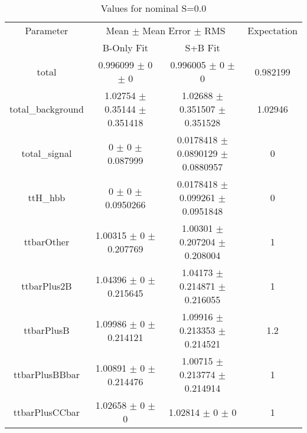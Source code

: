\begin{table}
\centering
\caption{Values for nominal S=0.0}
\begin{tabular}{cccc}
\toprule
Parameter & \multicolumn{2}{c}{Mean $\pm$ Mean Error $\pm$ RMS} & Expectation\\
 & B-Only Fit & S+B Fit & \\
\midrule
total & \num{0.996099} $\pm$ \num{0} $\pm$ \num{0} & \num{0.996005} $\pm$ \num{0} $\pm$ \num{0} & \num{0.982199}\\
total\_background & \num{1.02754} $\pm$ \num{0.35144} $\pm$ \num{0.351418} & \num{1.02688} $\pm$ \num{0.351507} $\pm$ \num{0.351528} & \num{1.02946}\\
total\_signal & \num{0} $\pm$ \num{0} $\pm$ \num{0.087999} & \num{0.0178418} $\pm$ \num{0.0890129} $\pm$ \num{0.0880957} & \num{0}\\
ttH\_hbb & \num{0} $\pm$ \num{0} $\pm$ \num{0.0950266} & \num{0.0178418} $\pm$ \num{0.099261} $\pm$ \num{0.0951848} & \num{0}\\
ttbarOther & \num{1.00315} $\pm$ \num{0} $\pm$ \num{0.207769} & \num{1.00301} $\pm$ \num{0.207204} $\pm$ \num{0.208004} & \num{1}\\
ttbarPlus2B & \num{1.04396} $\pm$ \num{0} $\pm$ \num{0.215645} & \num{1.04173} $\pm$ \num{0.214871} $\pm$ \num{0.216055} & \num{1}\\
ttbarPlusB & \num{1.09986} $\pm$ \num{0} $\pm$ \num{0.214121} & \num{1.09916} $\pm$ \num{0.213353} $\pm$ \num{0.214521} & \num{1.2}\\
ttbarPlusBBbar & \num{1.00891} $\pm$ \num{0} $\pm$ \num{0.214476} & \num{1.00715} $\pm$ \num{0.213774} $\pm$ \num{0.214914} & \num{1}\\
ttbarPlusCCbar & \num{1.02658} $\pm$ \num{0} $\pm$ \num{0} & \num{1.02814} $\pm$ \num{0} $\pm$ \num{0} & \num{1}\\
\bottomrule
\end{tabular}
\end{table}